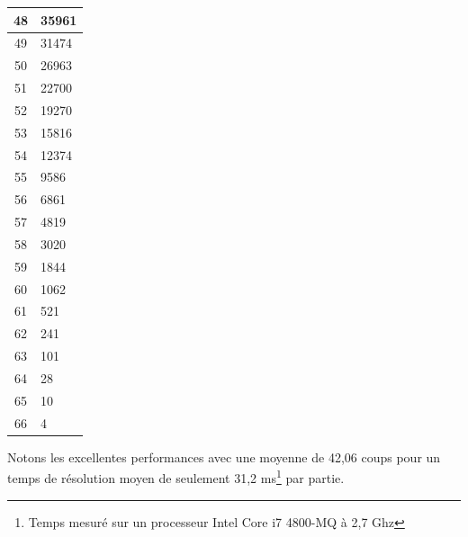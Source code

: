 \begin{center}
\begin{tabular}[t]{|c|l|}
\hline
48 & 35961\\
\hline
49 & 31474\\
\hline
50 & 26963\\
\hline
51 & 22700\\
\hline
52 & 19270\\
\hline
53 & 15816\\
\hline
54 & 12374\\
\hline
55 & 9586\\
\hline
56 & 6861\\
\hline
57 & 4819\\
\hline
58 & 3020\\
\hline
59 & 1844\\
\hline
60 & 1062\\
\hline
61 & 521\\
\hline
62 & 241\\
\hline
63 & 101\\
\hline
64 & 28\\
\hline
65 & 10\\
\hline
66 & 4\\
\hline
\end{tabular}
\end{center}

\begin{center}\label{histo_algo}
\end{center}

Notons les excellentes performances avec une moyenne de 42,06 coups pour un temps de résolution moyen de seulement 31,2 ms\footnote{Temps mesuré sur un processeur Intel Core i7 4800-MQ à 2,7 Ghz} par partie.
